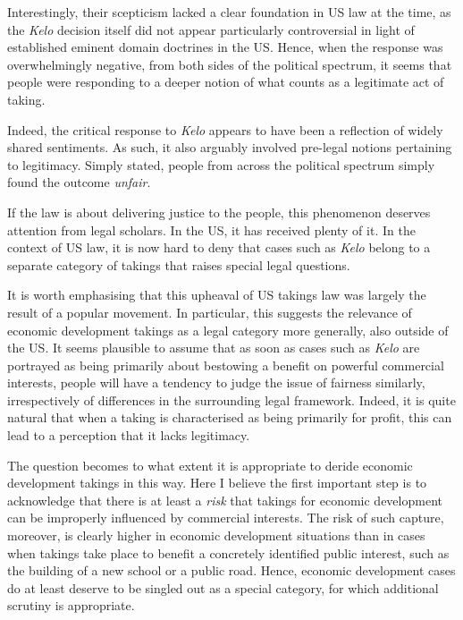 Interestingly, their scepticism lacked a clear foundation in US law at the time, as the {\it Kelo} decision itself did not appear particularly controversial in light of established eminent domain doctrines in the US. Hence, when the response was overwhelmingly negative, from both sides of the political spectrum, it seems that people were responding to a deeper notion of what counts as a legitimate act of taking.

Indeed, the critical response to {\it Kelo} appears to have been a reflection of widely shared sentiments. As such, it also arguably involved pre-legal notions pertaining to legitimacy. Simply stated, people from across the political spectrum simply found the outcome {\it unfair}.

If the law is about delivering justice to the people, this phenomenon deserves attention from legal scholars. In the US, it has received plenty of it. In the context of US law, it is now hard to deny that cases such as {\it Kelo} belong to a separate category of takings that raises special legal questions. 

It is worth emphasising that this upheaval of US takings law was largely the result of a popular movement. In particular, this suggests the relevance of economic development takings as a legal category more generally, also outside of the US. It seems plausible to assume that as soon as cases such as {\it Kelo} are portrayed as being primarily about bestowing a benefit on powerful commercial interests, people will have a tendency to judge the issue of fairness similarly, irrespectively of differences in the surrounding legal framework. Indeed, it is quite natural that when a taking is characterised as being primarily for profit, this can lead to a perception that it lacks legitimacy.

The question becomes to what extent it is appropriate to deride economic development takings in this way. Here I believe the first important step is to acknowledge that there is at least a {\it risk} that takings for economic development can be improperly influenced by commercial interests. The risk of such capture, moreover, is clearly higher in economic development situations than in cases when takings take place to benefit a concretely identified public interest, such as the building of a new school or a public road. Hence, economic development cases do at least deserve to be singled out as a special category, for which additional scrutiny is appropriate.

